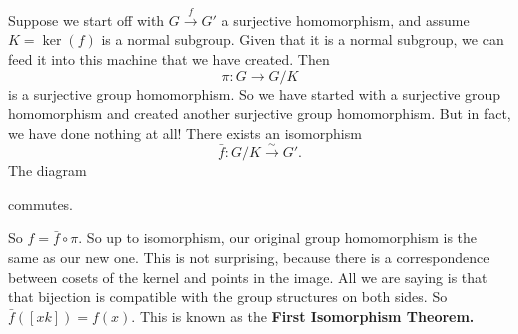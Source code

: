Suppose we start off with $G \xrightarrow{f} G'$ a surjective homomorphism, and assume $K = \ker(f)$ is a normal subgroup. Given that it is a normal subgroup, we can feed it into this machine that we have created. Then 
\[
\pi: G \rightarrow G/K
\]
is a surjective group homomorphism. So we have started with a surjective group homomorphism and created another surjective group homomorphism. But in fact, we have done nothing at all! There exists an isomorphism 
\[
\bar{f}: G/K \xrightarrow{\sim} G' .
\]
The diagram 

\begin{center}

\end{center}
commutes. 

So $f = \bar{f} \circ \pi.$ So up to isomorphism, our original group homomorphism is the same as our new one. This is not surprising, because there is a correspondence between cosets of the kernel and points in the image. All we are saying is that that bijection is compatible with the group structures on both sides. So $\bar{f}([xk]) = f(x).$ This is known as the \textbf{First Isomorphism Theorem.}

\newpage
